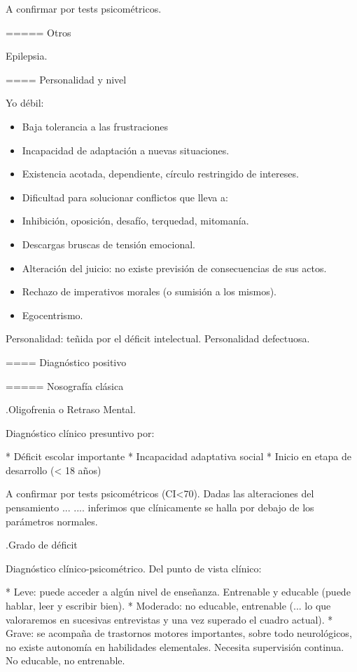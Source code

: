 \documentclass[encares.tex]{subfiles}
\begin{document}
A confirmar por tests psicométricos.

===== Otros

Epilepsia.

==== Personalidad y nivel

Yo débil:
\begin{itemize}
\item Baja tolerancia a las frustraciones
\item Incapacidad de adaptación a nuevas situaciones.
\item Existencia acotada, dependiente, círculo restringido de intereses.
\item Dificultad para solucionar conflictos que lleva a:
\item Inhibición, oposición, desafío, terquedad, mitomanía.
\item Descargas bruscas de tensión emocional.
\item Alteración del juicio: no existe previsión de consecuencias de sus actos.
\item Rechazo de imperativos morales (o sumisión a los mismos).
\item Egocentrismo.
\end{itemize}

Personalidad: teñida por el déficit intelectual. Personalidad defectuosa.

==== Diagnóstico positivo

===== Nosografía clásica

.Oligofrenia o Retraso Mental.

Diagnóstico clínico presuntivo por:

* Déficit escolar importante
* Incapacidad adaptativa social
* Inicio en etapa de desarrollo (< 18 años)

A confirmar por tests psicométricos (CI<70). Dadas las alteraciones del pensamiento ... .... inferimos que clínicamente se halla por debajo de los parámetros normales.

.Grado de déficit

Diagnóstico clínico-psicométrico. Del punto de vista clínico:

* Leve: puede acceder a algún nivel de enseñanza. Entrenable y educable (puede hablar, leer y escribir bien).
* Moderado: no educable, entrenable (... lo que valoraremos en sucesivas entrevistas y una vez superado el cuadro actual).
* Grave: se acompaña de trastornos motores importantes, sobre todo neurológicos, no existe autonomía en habilidades elementales. Necesita supervisión continua. No educable, no entrenable.
\end{document}
